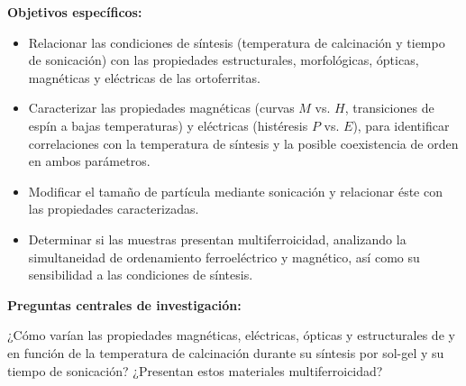 \documentclass[../main.tex]{subfiles}
\begin{document}
\textbf{Objetivos específicos:}
\begin{itemize}
    \item Relacionar las condiciones de síntesis (temperatura de calcinación y tiempo de sonicación) con las propiedades estructurales, morfológicas, ópticas, magnéticas y eléctricas de las ortoferritas.
    \item Caracterizar las propiedades magnéticas (curvas $M$ vs. $H$, transiciones de espín a bajas temperaturas) y eléctricas (histéresis $P$ vs. $E$), para identificar correlaciones con la temperatura de síntesis y la posible coexistencia de orden en ambos parámetros.
    \item Modificar el tamaño de partícula mediante sonicación y relacionar éste con las propiedades caracterizadas.
    \item Determinar si las muestras presentan multiferroicidad, analizando la simultaneidad de ordenamiento ferroeléctrico y magnético, así como su sensibilidad a las condiciones de síntesis.
\end{itemize}
\textbf{Preguntas centrales de investigación:}

¿Cómo varían las propiedades magnéticas, eléctricas, ópticas y estructurales de \neod{} y \sama{} en función de la temperatura de calcinación durante su síntesis por sol-gel y su tiempo de sonicación? ¿Presentan estos materiales multiferroicidad?
\end{document}
